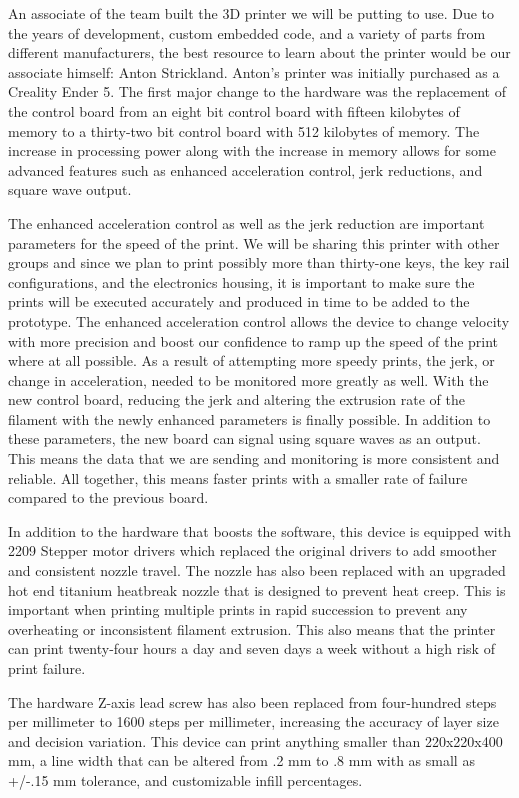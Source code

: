 An associate of the team built the 3D printer we will be putting to use. Due to the years of development, custom embedded code, and a variety of parts from different manufacturers, the best resource to learn about the printer would be our associate himself: Anton Strickland. Anton’s printer was initially purchased as a Creality Ender 5. The first major change to the hardware was the replacement of the control board from an eight bit control board with fifteen kilobytes of memory to a thirty-two bit control board with 512 kilobytes of memory. The increase in processing power along with the increase in memory allows for some advanced features such as enhanced acceleration control, jerk reductions, and square wave output.

The enhanced acceleration control as well as the jerk reduction are important parameters for the speed of the print. We will be sharing this printer with other groups and since we plan to print possibly more than thirty-one keys, the key rail configurations, and the electronics housing, it is important to make sure the prints will be executed accurately and produced in time to be added to the prototype. The enhanced acceleration control allows the device to change velocity with more precision and boost our confidence to ramp up the speed of the print where at all possible. As a result of attempting more speedy prints, the jerk, or change in acceleration, needed to be monitored more greatly as well. With the new control board, reducing the jerk and altering the extrusion rate of the filament with the newly enhanced parameters is finally possible. In addition to these parameters, the new board can signal using square waves as an output. This means the data that we are sending and monitoring is more consistent and reliable. All together, this means faster prints with a smaller rate of failure compared to the previous board.

In addition to the hardware that boosts the software, this device is equipped with 2209 Stepper motor drivers which replaced the original drivers to add smoother and consistent nozzle travel. The nozzle has also been replaced with an upgraded hot end titanium heatbreak nozzle that is designed to prevent heat creep. This is important when printing multiple prints in rapid succession to prevent any overheating or inconsistent filament extrusion. This also means that the printer can print twenty-four hours a day and seven days a week without a high risk of print failure.

The hardware Z-axis lead screw has also been replaced from four-hundred steps per millimeter to 1600 steps per millimeter, increasing the accuracy of layer size and decision variation. This device can print anything smaller than 220x220x400 mm, a line width that can be altered from .2 mm to .8 mm with as small as +/-.15 mm tolerance, and customizable infill percentages.

